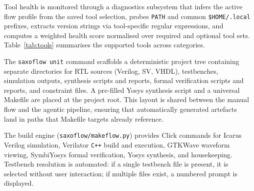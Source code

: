 Tool health is monitored through a diagnostics subsystem that infers the
active flow profile from the saved tool selection, probes \texttt{PATH} and
common \texttt{\$HOME/.local} prefixes, extracts version strings via
tool-specific regular expressions, and computes a weighted health score
normalised over required and optional tool sets.
Table~\ref{tab:tools} summarises the supported tools across categories.

The \texttt{saxoflow unit} command scaffolds a deterministic project tree
containing separate directories for \ac{RTL} sources (Verilog, \ac{SV}, VHDL),
testbenches, simulation outputs, synthesis scripts and reports, formal
verification scripts and reports, and constraint files. A pre-filled Yosys
synthesis script and a universal Makefile are placed at the project root. This
layout is shared between the manual flow and the agentic pipeline, ensuring
that automatically generated artefacts land in paths that Makefile targets
already reference.

The build engine (\texttt{saxoflow/makeflow.py}) provides Click commands for
Icarus Verilog simulation, Verilator \texttt{C++} build and execution, GTKWave
waveform viewing, SymbiYosys formal verification, Yosys synthesis, and
housekeeping. Testbench resolution is automated: if a single testbench file is
present, it is selected without user interaction; if multiple files exist,
a numbered prompt is displayed.

